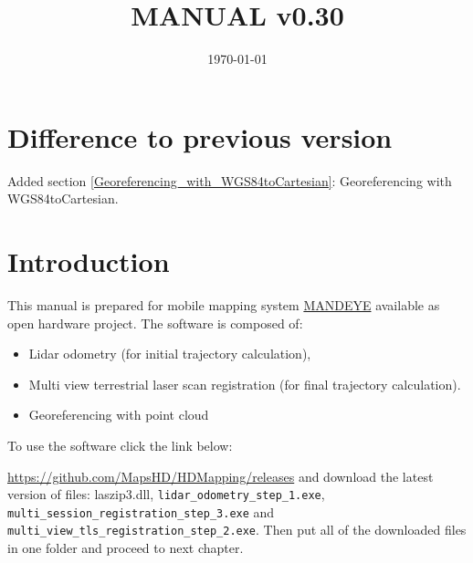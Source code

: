 \documentclass[a4paper,12pt]{book}
\begin{document}
\author{}
\title{MANUAL v0.30}
\date{\today}

\frontmatter
\maketitle
\tableofcontents

\mainmatter

\chapter{Difference to previous version}
Added section \ref{Georeferencing_with_WGS84toCartesian}: Georeferencing with WGS84toCartesian.

\chapter{Introduction}
This manual is prepared for mobile mapping system \href{https://github.com/JanuszBedkowski/mandeye_controller/blob/main/doc/manual/manual_v0_2/mandeye_dev_manual_v0_2.pdf}{MANDEYE} available as open hardware project.
The software is composed of:
\begin{itemize}
	\item Lidar odometry (for initial trajectory calculation),
	\item Multi view terrestrial laser scan registration (for final trajectory calculation).
	\item Georeferencing with point cloud
\end{itemize}
To use the software click the link below:

\url{https://github.com/MapsHD/HDMapping/releases}
\linebreak
and download the latest version of files: laszip3.dll, \verb|lidar_odometry_step_1.exe|, \verb|multi_session_registration_step_3.exe|  and \verb|multi_view_tls_registration_step_2.exe|.
Then put all of the downloaded files in one folder and proceed to next chapter.













\backmatter
\end{document}
